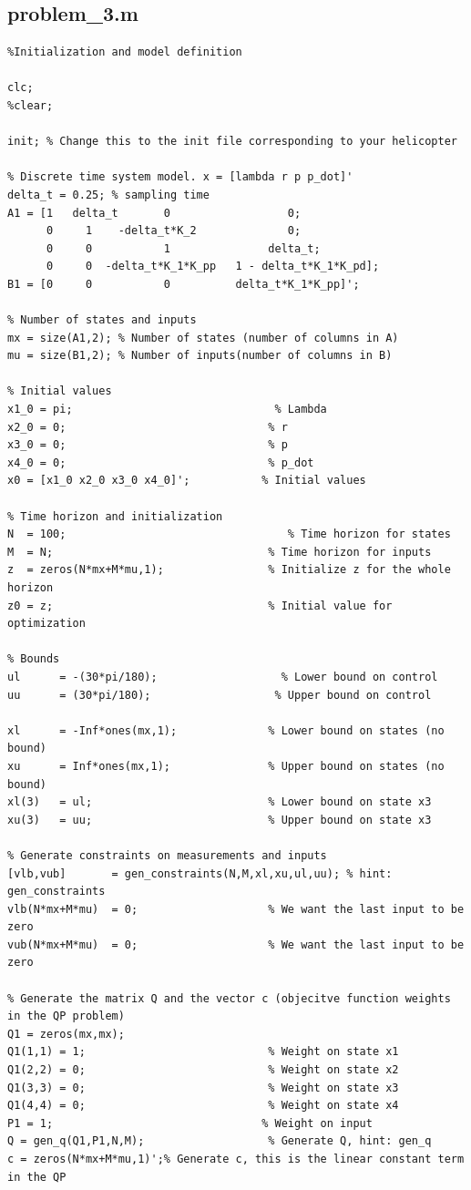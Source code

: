 \subsection{problem\_3.m}\label{sec:p3}
\begin{verbatim}
%Initialization and model definition

clc;
%clear;

init; % Change this to the init file corresponding to your helicopter

% Discrete time system model. x = [lambda r p p_dot]'
delta_t	= 0.25; % sampling time
A1 = [1   delta_t       0                  0;
      0     1    -delta_t*K_2              0;
      0     0           1               delta_t;
      0     0  -delta_t*K_1*K_pp   1 - delta_t*K_1*K_pd];
B1 = [0     0           0          delta_t*K_1*K_pp]';

% Number of states and inputs
mx = size(A1,2); % Number of states (number of columns in A)
mu = size(B1,2); % Number of inputs(number of columns in B)

% Initial values
x1_0 = pi;                               % Lambda
x2_0 = 0;                               % r
x3_0 = 0;                               % p
x4_0 = 0;                               % p_dot
x0 = [x1_0 x2_0 x3_0 x4_0]';           % Initial values

% Time horizon and initialization
N  = 100;                                  % Time horizon for states
M  = N;                                 % Time horizon for inputs
z  = zeros(N*mx+M*mu,1);                % Initialize z for the whole horizon
z0 = z;                                 % Initial value for optimization

% Bounds
ul 	    = -(30*pi/180);                   % Lower bound on control
uu 	    = (30*pi/180);                   % Upper bound on control

xl      = -Inf*ones(mx,1);              % Lower bound on states (no bound)
xu      = Inf*ones(mx,1);               % Upper bound on states (no bound)
xl(3)   = ul;                           % Lower bound on state x3
xu(3)   = uu;                           % Upper bound on state x3

% Generate constraints on measurements and inputs
[vlb,vub]       = gen_constraints(N,M,xl,xu,ul,uu); % hint: gen_constraints
vlb(N*mx+M*mu)  = 0;                    % We want the last input to be zero
vub(N*mx+M*mu)  = 0;                    % We want the last input to be zero

% Generate the matrix Q and the vector c (objecitve function weights in the QP problem)
Q1 = zeros(mx,mx);
Q1(1,1) = 1;                            % Weight on state x1
Q1(2,2) = 0;                            % Weight on state x2
Q1(3,3) = 0;                            % Weight on state x3
Q1(4,4) = 0;                            % Weight on state x4
P1 = 1;                                % Weight on input
Q = gen_q(Q1,P1,N,M);                   % Generate Q, hint: gen_q
c = zeros(N*mx+M*mu,1)';% Generate c, this is the linear constant term in the QP


\end{verbatim}
